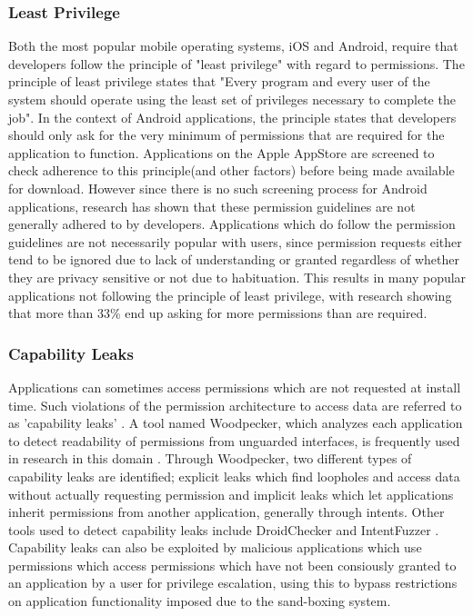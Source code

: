 \subsubsection{Least Privilege}
Both the most popular mobile operating systems, iOS and Android, require that developers follow the principle of "least privilege" with regard to permissions. The principle of least privilege states that "Every program and every user of the system should operate using the least set of privileges necessary to complete the job"\cite{schneider2004least}. In the context of Android applications, the principle states that developers should only ask for the very minimum of permissions that are required for the application to function\cite{enck2009understanding}. Applications on the Apple AppStore are screened to check adherence to this principle(and other factors) before being made available for download\cite{gilbert2011vision}. However since there is no such screening process for Android applications, research has shown that these permission guidelines are not generally adhered to by developers\cite{stevens2013asking}. Applications which do follow the permission guidelines are not necessarily popular with users, since permission requests either tend to be ignored due to lack of understanding\cite{felt2011android} \cite{kelley2012conundrum} or granted regardless of whether they are privacy sensitive or not due to habituation\cite{felt2012android}. This results in many popular applications not following the principle of least privilege\cite{wei2012permission}, with research showing that more than 33\% end up asking for more permissions than are required\cite{felt2011android}.

\subsubsection{Capability Leaks}
Applications can sometimes access permissions which are not requested at install time. Such violations of the permission architecture to access data are referred to as 'capability leaks' \cite{grace2012systematic} \cite{grace2011detecting}. A tool named Woodpecker, which analyzes each application to detect readability of permissions from unguarded interfaces, is frequently used in research in this domain \cite{zhou2012hey}. Through Woodpecker, two different types of capability leaks are identified; explicit leaks which find loopholes and access data without actually requesting permission and implicit leaks which let applications inherit permissions from another application, generally through intents. Other tools used to detect capability leaks include DroidChecker and IntentFuzzer \cite{yang2014intentfuzzer} \cite{chan2012droidchecker}. Capability leaks can also be exploited by malicious applications which use permissions which access permissions which have not been consiously granted to an application by a user for privilege escalation, using this to bypass restrictions on application functionality imposed due to the sand-boxing system\cite{davi2010privilege}.  

